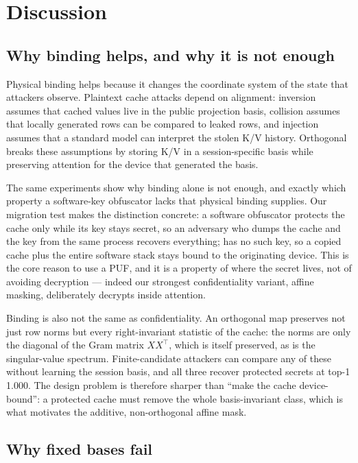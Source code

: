 \section{Discussion}
\label{sec:discussion}

\subsection{Why binding helps, and why it is not enough}

Physical binding helps because it changes the coordinate system of the state that attackers observe. Plaintext cache attacks depend on alignment: inversion assumes that cached values live in the public projection basis, collision assumes that locally generated rows can be compared to leaked rows, and injection assumes that a standard model can interpret the stolen K/V history. Orthogonal \sys{} breaks these assumptions by storing K/V in a session-specific basis while preserving attention for the device that generated the basis.

The same experiments show why binding alone is not enough, and exactly which property a software-key obfuscator lacks that physical binding supplies. Our migration test makes the distinction concrete: a software obfuscator protects the cache only while its key stays secret, so an adversary who dumps the cache and the key from the same process recovers everything; \sys{} has no such key, so a copied cache plus the entire software stack stays bound to the originating device. This is the core reason to use a PUF, and it is a property of where the secret lives, not of avoiding decryption --- indeed our strongest confidentiality variant, affine masking, deliberately decrypts inside attention.

Binding is also not the same as confidentiality. An orthogonal map preserves not just row norms but every right-invariant statistic of the cache: the norms are only the diagonal of the Gram matrix $XX^\top$, which is itself preserved, as is the singular-value spectrum. Finite-candidate attackers can compare any of these without learning the session basis, and all three recover protected secrets at top-1 1.000. The design problem is therefore sharper than ``make the cache device-bound'': a protected cache must remove the whole basis-invariant class, which is what motivates the additive, non-orthogonal affine mask.

\subsection{Why fixed bases fail}

